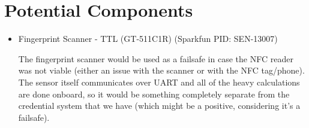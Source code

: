 \documentclass{article}
\begin{document}
\section{Potential Components}

\begin{itemize}
\item Fingerprint Scanner - TTL (GT-511C1R) (Sparkfun PID: SEN-13007)

The fingerprint scanner would be used as a failsafe in case the NFC reader was
not viable (either an issue with the scanner or with the NFC tag/phone). The
sensor itself communicates over UART and all of the heavy calculations are done
onboard, so it would be something completely separate from the credential
system that we have (which might be a positive, considering it's a failsafe).

\end{itemize}
\end{document}
